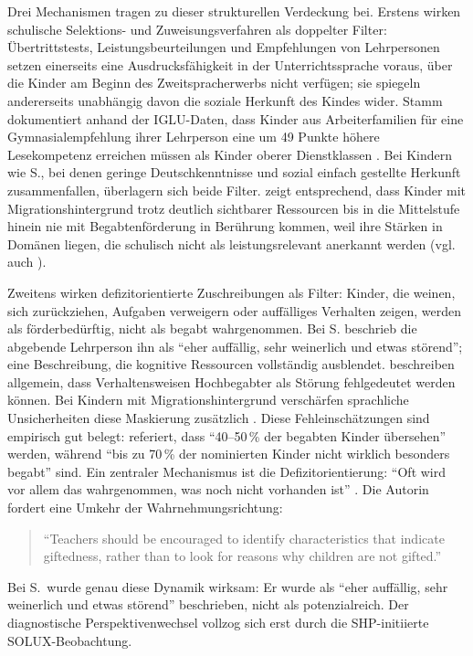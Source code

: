 \documentclass[ngerman, a4paper]{article}
\begin{document}
Drei Mechanismen tragen zu dieser strukturellen Verdeckung bei. Erstens
wirken schulische Selektions- und Zuweisungsverfahren als doppelter Filter:
Übertrittstests, Leistungsbeurteilungen und Empfehlungen von Lehrpersonen
setzen einerseits eine Ausdrucksfähigkeit in der Unterrichtssprache voraus,
über die Kinder am Beginn des Zweitspracherwerbs nicht verfügen; sie
spiegeln andererseits unabhängig davon die soziale Herkunft des Kindes
wider. Stamm dokumentiert anhand der IGLU-Daten, dass Kinder aus
Arbeiterfamilien für eine Gymnasialempfehlung ihrer Lehrperson eine um
49 Punkte höhere Lesekompetenz erreichen müssen als Kinder oberer
Dienstklassen \parencite[S.\,36--37]{stamm2025vonuntennachoben}. Bei
Kindern wie S., bei denen geringe Deutschkenntnisse und sozial einfach
gestellte Herkunft zusammenfallen, überlagern sich beide Filter.
\textcite[S.\,76--78]{kellerkoller2021hellekoepfe} zeigt entsprechend, dass
Kinder mit Migrationshintergrund trotz deutlich sichtbarer Ressourcen bis
in die Mittelstufe hinein nie mit Begabtenförderung in Berührung kommen,
weil ihre Stärken in Domänen liegen, die schulisch nicht als
leistungsrelevant anerkannt werden (vgl. auch
\textcite{kellerkoller2011erkennen}).

Zweitens wirken defizitorientierte Zuschreibungen als Filter: Kinder, die weinen,
sich zurückziehen, Aufgaben verweigern oder auffälliges Verhalten zeigen, werden
als förderbedürftig, nicht als begabt wahrgenommen. Bei S. beschrieb die abgebende
Lehrperson ihn als \enquote{eher auffällig, sehr weinerlich und etwas störend}; eine
Beschreibung, die kognitive Ressourcen vollständig ausblendet.
\textcite[S.\,87--94]{webb2020doppeldiagnosen} beschreiben allgemein, dass
Verhaltensweisen Hochbegabter als Störung fehlgedeutet werden können. Bei
Kindern mit Migrationshintergrund verschärfen sprachliche Unsicherheiten diese
Maskierung zusätzlich \parencite[S.\,576--587]{stamm2021fehlenderblick}.
Diese Fehleinschätzungen sind empirisch gut belegt:
\textcite[S.\,229]{muelleroppliger2021paeddiagnostik} referiert, dass
\enquote{40--50\,\% der begabten Kinder übersehen} werden, während
\enquote{bis zu 70\,\% der nominierten Kinder nicht wirklich besonders
begabt} sind. Ein zentraler Mechanismus ist die Defizitorientierung:
\enquote{Oft wird vor allem das wahrgenommen, was noch nicht vorhanden
ist} \parencite[S.\,229]{muelleroppliger2021paeddiagnostik}. Die Autorin
fordert eine Umkehr der Wahrnehmungsrichtung:
\begin{quote}
\foreignlanguage{english}{\enquote{Teachers \textelp{} should be
encouraged to identify characteristics that indicate giftedness, rather
than to look for reasons why children are not gifted.}}
\parencite[S.\,228]{muelleroppliger2021paeddiagnostik}
\end{quote}
Bei S.\ wurde genau diese Dynamik wirksam: Er wurde als \enquote{eher
auffällig, sehr weinerlich und etwas störend} beschrieben, nicht als
potenzialreich. Der diagnostische Perspektivenwechsel vollzog sich erst
durch die SHP-initiierte SOLUX-Beobachtung.
\end{document}
